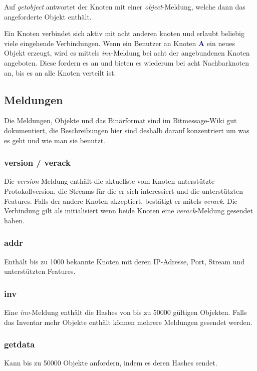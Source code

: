 \documentclass{bfh}
\newcommand{\msg}[1]{\textit{\textcolor{RedOrange}{#1}}}
\newcommand{\node}[1]{\textbf{\textcolor{MidnightBlue}{#1}}}
\begin{document}
  Auf \msg{getobject} antwortet der Knoten mit einer \msg{object}-Meldung, welche dann das angeforderte Objekt enthält.

  Ein Knoten verbindet sich aktiv mit acht anderen knoten und erlaubt beliebig viele eingehende Verbindungen. Wenn ein Benutzer an Knoten \node{A} ein neues Objekt erzeugt, wird es mittels \msg{inv}-Meldung bei acht der angebundenen Knoten angeboten. Diese fordern es an und bieten es wiederum bei acht Nachbarknoten an, bis es an alle Knoten verteilt ist.

  \subsection{Meldungen}

  Die Meldungen, Objekte und das Binärformat sind im Bitmessage-Wiki gut dokumentiert\cite{wiki:protocol}, die Beschreibungen hier sind deshalb darauf konzentriert um was es geht und wie man sie benutzt.

  \subsubsection{version / verack}
  Die \msg{version}-Meldung enthält die aktuellste vom Knoten unterstützte Protokollversion, die Streams für die er sich interessiert und die unterstützten Features. Falls der andere Knoten akzeptiert, bestätigt er mitels \msg{verack}. Die Verbindung gilt als initialisiert wenn beide Knoten eine \msg{verack}-Meldung gesendet haben.

  \subsubsection{addr}
  Enthält bis zu 1000 bekannte Knoten mit deren IP-Adresse, Port, Stream und unterstützten Features.

  \subsubsection{inv}
  Eine \msg{inv}-Meldung enthält die Hashes von bis zu 50000 gültigen Objekten. Falls das Inventar mehr Objekte enthält können mehrere Meldungen gesendet werden.

  \subsubsection{getdata}
  Kann bis zu 50000 Objekte anfordern, indem es deren Hashes sendet.
\end{document}
